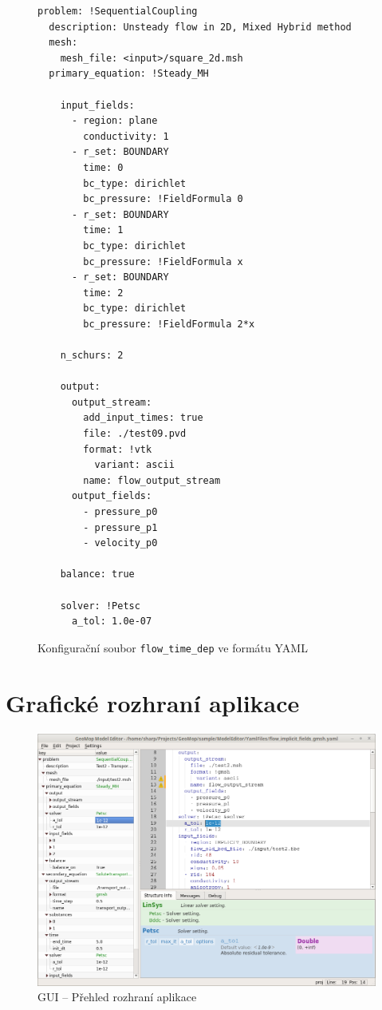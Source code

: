 \documentclass[FM,bw,DP]{tulthesis}
\begin{document}
\clearpage
\begin{figure}[h]
\begin{lstlisting}
problem: !SequentialCoupling
  description: Unsteady flow in 2D, Mixed Hybrid method
  mesh:
    mesh_file: <input>/square_2d.msh
  primary_equation: !Steady_MH
  
    input_fields:
      - region: plane
        conductivity: 1
      - r_set: BOUNDARY
        time: 0
        bc_type: dirichlet
        bc_pressure: !FieldFormula 0
      - r_set: BOUNDARY
        time: 1
        bc_type: dirichlet
        bc_pressure: !FieldFormula x
      - r_set: BOUNDARY
        time: 2
        bc_type: dirichlet
        bc_pressure: !FieldFormula 2*x
          
    n_schurs: 2
    
    output:
      output_stream:
        add_input_times: true
        file: ./test09.pvd
        format: !vtk
          variant: ascii
        name: flow_output_stream
      output_fields:
        - pressure_p0
        - pressure_p1
        - velocity_p0
        
    balance: true
    
    solver: !Petsc
      a_tol: 1.0e-07
\end{lstlisting}
\vspace*{-20pt}
\caption{Konfigurační soubor \texttt{flow\_time\_dep} ve formátu YAML}
\label{img:reference-con}
\end{figure}


\chapter{Grafické rozhraní aplikace}
\label{apx:gui}

\begin{figure}[h]
	\centering
    \includegraphics[width=\textwidth]{../img/screenshots/gui_overview.png}
    \caption{GUI -- Přehled rozhraní aplikace}
	\label{img:gui_overview}
\end{figure}
\end{document}
